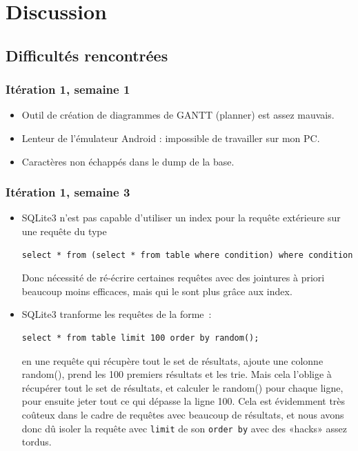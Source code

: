\documentclass[a4paper,11pt,french]{article}
\begin{document}
\section{Discussion}
\subsection{Difficultés rencontrées}
\subsubsection{Itération 1, semaine 1}
\begin{itemize}
\item Outil de création de diagrammes de GANTT (planner) est assez mauvais.
\item Lenteur de l'émulateur Android : impossible de travailler sur mon PC.%
\item Caractères non échappés dans le dump de la base.%
\end{itemize}

\subsubsection{Itération 1, semaine 3}
\begin{itemize}
\item SQLite3 n'est pas capable d'utiliser un index pour la requête extérieure sur une requête du type
\begin{verbatim}
select * from (select * from table where condition) where condition
\end{verbatim}
Donc nécessité de ré-écrire certaines requêtes avec des jointures à priori beaucoup moins efficaces, mais qui le sont plus grâce aux index.
\item SQLite3 tranforme les requêtes de la forme~:
\begin{verbatim}
select * from table limit 100 order by random();
\end{verbatim}
  en une requête qui récupère tout le set de résultats, ajoute une colonne random(), prend les 100 premiers résultats et les trie. Mais cela
  l'oblige à récupérer tout le set de résultats, et calculer le random() pour chaque ligne, pour ensuite jeter tout ce qui dépasse la ligne
  100. Cela est évidemment très coûteux dans le cadre de requêtes avec beaucoup de résultats, et nous avons donc dû isoler la requête avec
  \verb!limit! de son \verb!order by! avec des «hacks» assez tordus.
\end{itemize}
\end{document}

